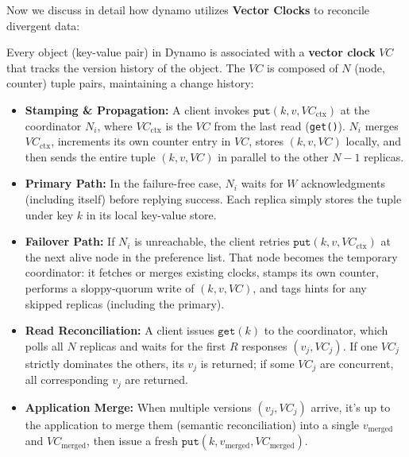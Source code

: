    \noindent
    Now we discuss in detail how dynamo utilizes \textbf{Vector Clocks} to reconcile divergent data:
    \begin{Def}

        Every object (key-value pair) in Dynamo is associated with a \textbf{vector clock} $VC$ that tracks the version history of the object. The $VC$ is composed of $N$ (node, counter) tuple pairs, maintaining a change history:
        
        \begin{itemize}
          \item \textbf{Stamping \& Propagation:}  
            A client invokes $\texttt{put}(k,v,VC_{\mathrm{ctx}})$ at the coordinator $N_i$, where $VC_{\mathrm{ctx}}$ is the $VC$ from the last read (\texttt{get()}). $N_i$ merges $VC_{\mathrm{ctx}}$, increments its own counter entry in $VC$, 
            stores $(k,v,VC)$ locally, and then sends the entire tuple $(k,v,VC)$ in parallel to the other $N-1$ replicas.
        
          \item \textbf{Primary Path:}  
            In the failure-free case, $N_i$ waits for $W$ acknowledgments (including itself) before replying success. Each replica simply stores the tuple under key $k$ in its local key-value store.
        
          \item \textbf{Failover Path:}  
            If $N_i$ is unreachable, the client retries $\texttt{put}(k,v,VC_{\mathrm{ctx}})$ at the next alive node in the preference list. That node becomes the temporary coordinator: 
            it fetches or merges existing clocks, stamps its own counter, performs a sloppy-quorum write of $(k,v,VC)$, and tags hints for any skipped replicas (including the primary).
        
          \item \textbf{Read Reconciliation:}  
            A client issues $\texttt{get}(k)$ to the coordinator, which polls all $N$ replicas and waits for the first $R$ responses $(v_j,VC_j)$. If one $VC_j$ strictly dominates the others, its $v_j$ is returned; if some $VC_j$ are concurrent, all corresponding $v_j$ are returned.
        
          \item \textbf{Application Merge:}  
            When multiple versions $(v_j,VC_j)$ arrive, it's up to the application to merge them (semantic reconciliation) into a single $v_{\mathrm{merged}}$ and $VC_{\mathrm{merged}}$, then issue a fresh $\texttt{put}(k,v_{\mathrm{merged}},VC_{\mathrm{merged}})$.
        \end{itemize}
        \end{Def}

